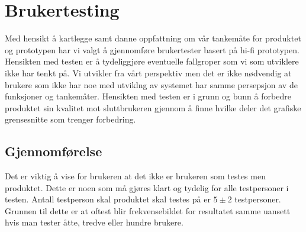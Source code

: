 \chapter{Brukertesting}
\lettrine[lines=2]{M}{}ed hensikt å kartlegge samt danne oppfattning om vår tankemåte for produktet og prototypen har vi valgt å gjennomføre brukertester basert på hi-fi prototypen. Hensikten med testen er å tydeliggjøre eventuelle fallgroper som vi som utviklere ikke har tenkt på. 
Vi utvikler fra vårt perspektiv men det er ikke nødvendig at brukere som ikke har noe med utviklng av systemet har samme persepsjon av de funksjoner og tankemåter. 
Hensikten med testen er i grunn og bunn å forbedre produktet sin kvalitet mot sluttbrukeren gjennom å finne hvilke deler det grafiske grensesnitte som trenger forbedring. 

\section{Gjennomførelse}
Det er viktig å vise for brukeren at det ikke er brukeren som testes men produktet. 
Dette er noen som må gjøres klart og tydelig for alle testpersoner i testen. Antall testperson skal produktet skal testes på er $5 \pm 2$ testpersoner. Grunnen til dette er at oftest blir frekvensebildet for resultatet samme uansett hvis man tester åtte, tredve eller hundre brukere.\cite{lazar2010research}\cite{book:utforming}

